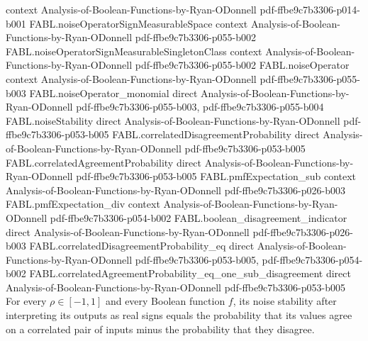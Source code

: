 \begin{theorem}
  {context}
  {Analysis-of-Boolean-Functions-by-Ryan-ODonnell}
  {pdf-ffbe9c7b3306-p014-b001}
\proofstep
  {FABL.noiseOperatorSignMeasurableSpace}
  {context}
  {Analysis-of-Boolean-Functions-by-Ryan-ODonnell}
  {pdf-ffbe9c7b3306-p055-b002}
\proofstep
  {FABL.noiseOperatorSignMeasurableSingletonClass}
  {context}
  {Analysis-of-Boolean-Functions-by-Ryan-ODonnell}
  {pdf-ffbe9c7b3306-p055-b002}
\proofstep
  {FABL.noiseOperator}
  {context}
  {Analysis-of-Boolean-Functions-by-Ryan-ODonnell}
  {pdf-ffbe9c7b3306-p055-b003}
\proofstep
  {FABL.noiseOperator_monomial}
  {direct}
  {Analysis-of-Boolean-Functions-by-Ryan-ODonnell}
  {pdf-ffbe9c7b3306-p055-b003,
    pdf-ffbe9c7b3306-p055-b004}
\proofstep
  {FABL.noiseStability}
  {direct}
  {Analysis-of-Boolean-Functions-by-Ryan-ODonnell}
  {pdf-ffbe9c7b3306-p053-b005}
\proofstep
  {FABL.correlatedDisagreementProbability}
  {direct}
  {Analysis-of-Boolean-Functions-by-Ryan-ODonnell}
  {pdf-ffbe9c7b3306-p053-b005}
\proofstep
  {FABL.correlatedAgreementProbability}
  {direct}
  {Analysis-of-Boolean-Functions-by-Ryan-ODonnell}
  {pdf-ffbe9c7b3306-p053-b005}
\proofstep
  {FABL.pmfExpectation_sub}
  {context}
  {Analysis-of-Boolean-Functions-by-Ryan-ODonnell}
  {pdf-ffbe9c7b3306-p026-b003}
\proofstep
  {FABL.pmfExpectation_div}
  {context}
  {Analysis-of-Boolean-Functions-by-Ryan-ODonnell}
  {pdf-ffbe9c7b3306-p054-b002}
\proofstep
  {FABL.boolean_disagreement_indicator}
  {direct}
  {Analysis-of-Boolean-Functions-by-Ryan-ODonnell}
  {pdf-ffbe9c7b3306-p026-b003}
\proofstep
  {FABL.correlatedDisagreementProbability_eq}
  {direct}
  {Analysis-of-Boolean-Functions-by-Ryan-ODonnell}
  {pdf-ffbe9c7b3306-p053-b005,
    pdf-ffbe9c7b3306-p054-b002}
\proofstep
  {FABL.correlatedAgreementProbability_eq_one_sub_disagreement}
  {direct}
  {Analysis-of-Boolean-Functions-by-Ryan-ODonnell}
  {pdf-ffbe9c7b3306-p053-b005}
For every $\rho\in[-1,1]$ and every Boolean function $f$, its noise stability after
interpreting its outputs as real signs equals the probability that its values agree on a
correlated pair of inputs minus the probability that they disagree.
\end{theorem}

